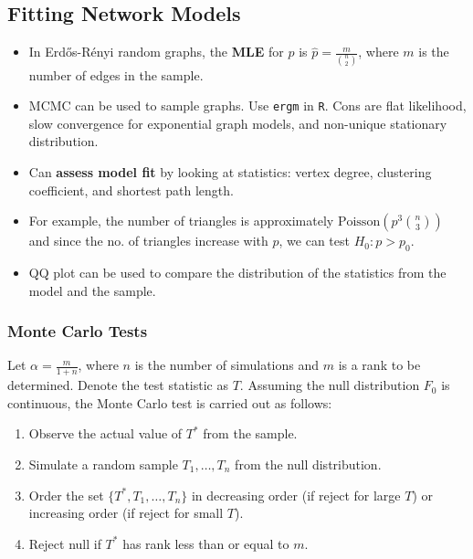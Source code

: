 \documentclass{article}
\begin{document}
\subsection{Fitting Network Models}
\begin{itemize}
    \item In Erd\H{o}s-R\'{e}nyi random graphs, the \textbf{MLE} for $p$ is $\hat{p}=\frac{m}{\binom{n}{2}}$, where $m$ is the number of edges in the sample.
    \item MCMC can be used to sample graphs. Use \verb|ergm| in \verb|R|. Cons are flat likelihood, slow convergence for exponential graph models, and non-unique stationary distribution.
    \item Can \textbf{assess model fit} by looking at statistics: vertex degree, clustering coefficient, and shortest path length.
    \item For example, the number of triangles is approximately $\mathrm{Poisson}(p^3\binom{n}{3})$ and since the no. of triangles increase with $p$, we can test $H_0: p>p_0$. 
    \item QQ plot can be used to compare the distribution of the statistics from the model and the sample.
\end{itemize}

\subsubsection{Monte Carlo Tests} 
Let $\alpha = \frac{m}{1+n}$, where $n$ is the number of simulations and $m$ is a rank to be determined. Denote the test statistic as $T$. Assuming the null distribution $F_0$ is continuous, the Monte Carlo test is carried out as follows:
\begin{enumerate}
    \item Observe the actual value of $T^*$ from the sample.
    \item Simulate a random sample $T_1, \ldots, T_n$ from the null distribution.
    \item Order the set $\{T^*, T_1, \ldots, T_n\}$ in decreasing order (if reject for large $T$) or increasing order (if reject for small $T$).
    \item Reject null if $T^*$ has rank less than or equal to $m$.
\end{enumerate}
\end{document}
